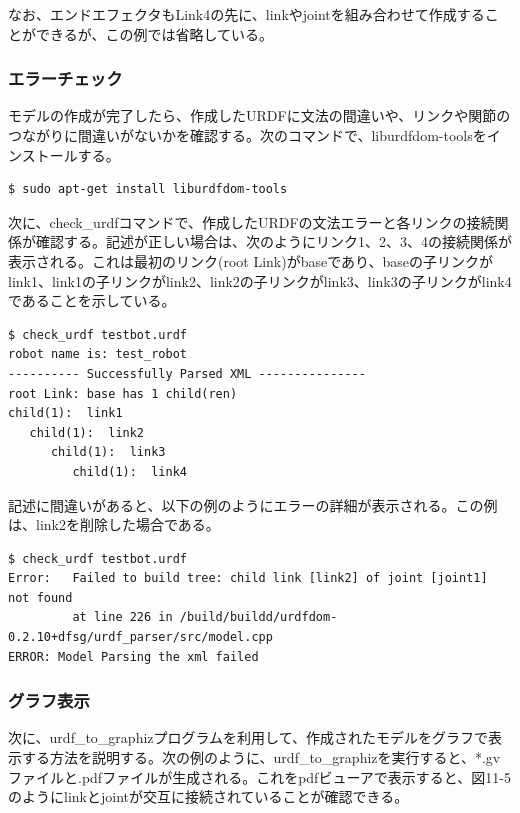 なお、エンドエフェクタもLink4の先に、linkやjointを組み合わせて作成することができるが、この例では省略している。

\subsubsection{エラーチェック}

モデルの作成が完了したら、作成したURDFに文法の間違いや、リンクや関節のつながりに間違いがないかを確認する。次のコマンドで、liburdfdom-toolsをインストールする。

\begin{lstlisting}[language=ROS]
$ sudo apt-get install liburdfdom-tools
\end{lstlisting}

次に、check\_urdfコマンドで、作成したURDFの文法エラーと各リンクの接続関係が確認する。記述が正しい場合は、次のようにリンク1、2、3、4の接続関係が表示される。これは最初のリンク(root Link)がbaseであり、baseの子リンクがlink1、link1の子リンクがlink2、link2の子リンクがlink3、link3の子リンクがlink4であることを示している。

\begin{lstlisting}[language=ROS]
$ check_urdf testbot.urdf
robot name is: test_robot
---------- Successfully Parsed XML ---------------
root Link: base has 1 child(ren)
child(1):  link1
   child(1):  link2
      child(1):  link3
         child(1):  link4
\end{lstlisting}

記述に間違いがあると、以下の例のようにエラーの詳細が表示される。この例は、link2を削除した場合である。

\begin{lstlisting}[language=ROS]
$ check_urdf testbot.urdf
Error:   Failed to build tree: child link [link2] of joint [joint1] not found
         at line 226 in /build/buildd/urdfdom-0.2.10+dfsg/urdf_parser/src/model.cpp
ERROR: Model Parsing the xml failed
\end{lstlisting}

\subsubsection{グラフ表示}
次に、urdf\_to\_graphizプログラムを利用して、作成されたモデルをグラフで表示する方法を説明する。次の例のように、urdf\_to\_graphizを実行すると、*.gvファイルと.pdfファイルが生成される。これをpdfビューアで表示すると、図11-5のようにlinkとjointが交互に接続されていることが確認できる。

